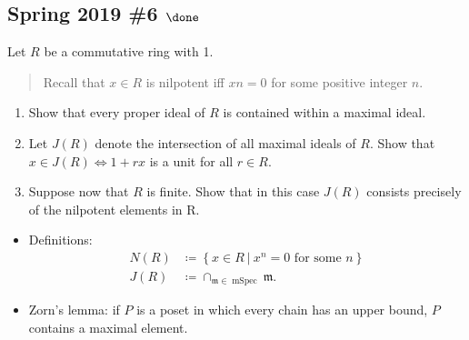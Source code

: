 \hypertarget{spring-2019-6-done}{%
\subsection{\texorpdfstring{Spring 2019 \#6
\(\done\)}{Spring 2019 \#6 \textbackslash done}}\label{spring-2019-6-done}}

Let \(R\) be a commutative ring with 1.

\begin{quote}
Recall that \(x \in R\) is nilpotent iff \(xn = 0\) for some positive
integer \(n\).
\end{quote}

\begin{enumerate}
\def\labelenumi{\alph{enumi}.}
\item
  Show that every proper ideal of \(R\) is contained within a maximal
  ideal.
\item
  Let \(J(R)\) denote the intersection of all maximal ideals of \(R\).
  Show that \(x \in J(R) \iff 1 + rx\) is a unit for all \(r \in R\).
\item
  Suppose now that \(R\) is finite. Show that in this case \(J(R)\)
  consists precisely of the nilpotent elements in R.
\end{enumerate}

\begin{concept}

\envlist

\begin{itemize}
\item
  Definitions:
  \begin{align*}
  N(R) &\coloneqq\left\{{x\in R {~\mathrel{\Big|}~}x^n = 0 \text{ for some } n}\right\} \\
  J(R) &\coloneqq\cap_{{\mathfrak{m}}\in \operatorname{mSpec}} {\mathfrak{m}}
  .\end{align*}
\item
  Zorn's lemma: if \(P\) is a poset in which every chain has an upper
  bound, \(P\) contains a maximal element.
\end{itemize}

\end{concept}

